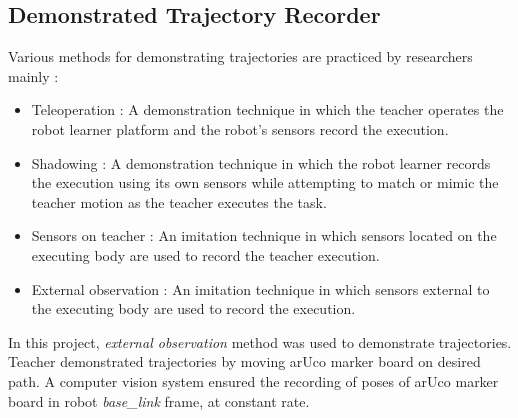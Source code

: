 \subsection{Demonstrated Trajectory Recorder}
Various methods for demonstrating trajectories are practiced by researchers mainly :
\begin{itemize} 
	
	\item Teleoperation : A demonstration technique in which the teacher operates the robot learner platform and the robot’s sensors record the execution. 	\cite{argall2009survey}	
	
	\item Shadowing : A demonstration technique in which the robot learner records the execution using its own sensors while attempting to match or mimic the teacher motion as the teacher executes the task.
	
	\item Sensors on teacher : An imitation technique in which sensors located on the executing body are used to record the teacher execution.
	
	\item External observation : An imitation technique in which sensors external to the executing body are used to record the execution.
	
\end{itemize}

In this project, \textit{external observation} method was used to demonstrate trajectories. Teacher demonstrated trajectories by moving arUco marker board on desired path. A computer vision system ensured the recording of poses of arUco marker board in robot \textit{base\_link} frame, at constant rate. 

